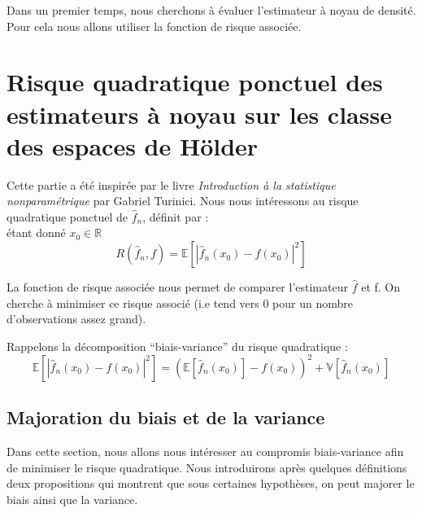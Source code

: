 \documentclass[
]{book}
\begin{document}
Dans un premier temps, nous cherchons à évaluer l'estimateur à noyau de densité. Pour cela nous allons utiliser la fonction de risque associée.

\hypertarget{risque-quadratique-ponctuel-des-estimateurs-uxe0-noyau-sur-les-classe-des-espaces-de-huxf6lder}{%
\section{Risque quadratique ponctuel des estimateurs à noyau sur les classe des espaces de Hölder}\label{risque-quadratique-ponctuel-des-estimateurs-uxe0-noyau-sur-les-classe-des-espaces-de-huxf6lder}}

Cette partie a été inspirée par le livre \emph{Introduction à la statistique nonparamétrique} par Gabriel Turinici.
Nous nous intéressons au risque quadratique ponctuel de \(\hat{f}_n\), définit par :\\
étant donné \(x_0 \in \mathbb{R}\)
\[
R(\hat {f}_n, f) = \mathbb{E}[|\hat {f}_n(x_0) - f(x_0)|^2]
\]

\begin{rem}
  La fonction de risque associée nous permet de comparer l'estimateur $\hat f$ et  f.\newline
On cherche à minimiser ce risque associé (i.e tend vers 0 pour un nombre d'observations assez grand).\newline
\end{rem}

Rappelons la décomposition ``biais-variance'' du risque quadratique :
\[
\mathbb{E}[|\hat {f}_n(x_0) - f(x_0)|^2] = (\mathbb{E}[\hat {f}_n(x_0)] - f(x_0))^2 + \mathbb{V}[\hat {f}_n(x_0)]
\]

\hypertarget{majoration-du-biais-et-de-la-variance}{%
\subsection{Majoration du biais et de la variance}\label{majoration-du-biais-et-de-la-variance}}

Dans cette section, nous allons nous intéresser au compromis biais-variance afin de minimiser le risque quadratique.
Nous introduirons après quelques définitions deux propositions qui montrent que sous certaines hypothèses, on peut majorer le biais ainsi que la variance.\newline
\end{document}
